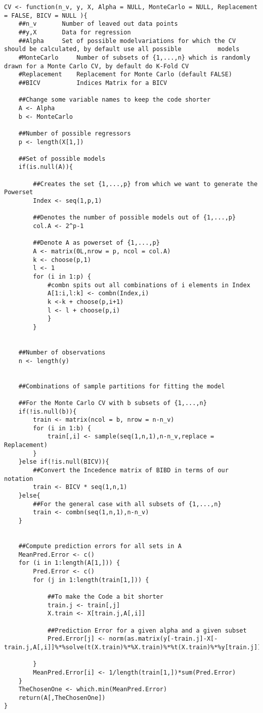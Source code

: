 \documentclass[Research_Module_ES.tex]{subfiles}
\begin{document}
\begin{lstlisting}[title={Cross-Validation Function}]
CV <- function(n_v, y, X, Alpha = NULL, MonteCarlo = NULL, Replacement = FALSE, BICV = NULL ){
	##n_v		Number of leaved out data points
	##y,X		Data for regression
	##Alpha	  	Set of possible modelvariations for which the CV 	     should be calculated, by default use all possible 		    models
	#MonteCarlo   	Number of subsets of {1,...,n} which is randomly 	     drawn for a Monte Carlo CV, by default do K-Fold CV
	#Replacement  	Replacement for Monte Carlo (default FALSE)
	##BICV          Indices Matrix for a BICV

	##Change some variable names to keep the code shorter
	A <- Alpha
	b <- MonteCarlo

	##Number of possible regressors
	p <- length(X[1,])                          

	##Set of possible models
	if(is.null(A)){

		##Creates the set {1,...,p} from which we want to generate the Powerset
		Index <- seq(1,p,1)    

		##Denotes the number of possible models out of {1,...,p}
		col.A <- 2^p-1
		
		##Denote A as powerset of {1,...,p}
		A <- matrix(0L,nrow = p, ncol = col.A)      
		k <- choose(p,1)
		l <- 1
		for (i in 1:p) {
			#combn spits out all combinations of i elements in Index 
			A[1:i,l:k] <- combn(Index,i)             
			k <-k + choose(p,i+1)
			l <- l + choose(p,i)
			}
		}


	##Number of observations
	n <- length(y)


	##Combinations of sample partitions for fitting the model

	##For the Monte Carlo CV with b subsets of {1,...,n}
	if(!is.null(b)){
		train <- matrix(ncol = b, nrow = n-n_v)
		for (i in 1:b) {
			train[,i] <- sample(seq(1,n,1),n-n_v,replace = Replacement)
		}
	}else if(!is.null(BICV)){
		##Convert the Incedence matrix of BIBD in terms of our notation
		train <- BICV * seq(1,n,1)
	}else{
		##For the general case with all subsets of {1,...,n} 
		train <- combn(seq(1,n,1),n-n_v)
	}


	##Compute prediction errors for all sets in A
	MeanPred.Error <- c()
	for (i in 1:length(A[1,])) {
		Pred.Error <- c()
		for (j in 1:length(train[1,])) {
		
			##To make the Code a bit shorter
			train.j <- train[,j]                 
			X.train <- X[train.j,A[,i]] 
			   
			##Prediction Error for a given alpha and a given subset
			Pred.Error[j] <- norm(as.matrix(y[-train.j]-X[-train.j,A[,i]]%*%solve(t(X.train)%*%X.train)%*%t(X.train)%*%y[train.j]),"2")^2

		}
		MeanPred.Error[i] <- 1/length(train[1,])*sum(Pred.Error)
	}
	TheChosenOne <- which.min(MeanPred.Error)
	return(A[,TheChosenOne])
}
\end{lstlisting}
\end{document}
